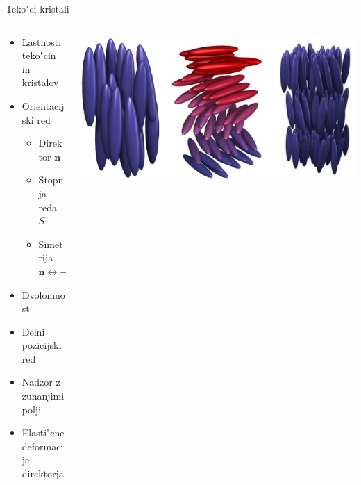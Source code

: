 \documentclass{beamer}
\renewcommand{\vec}{\mathbf}
\begin{document}
\begin{frame}{Teko"ci kristali}
 \begin{columns}[c]
  \begin{column}{.5\textwidth}
  
   \begin{itemize}
    \item Lastnosti teko"cin in kristalov
    \item Orientacijski red
      \begin{itemize}
	\item Direktor $\vec n$
	\item Stopnja reda $S$
	\item Simetrija $\vec n \leftrightarrow -\vec n$
      \end{itemize}
    \item Dvolomnost
    \item Delni pozicijski red
    \item Nadzor z zunanjimi polji
    \item Elasti"cne deformacije direktorja
   \end{itemize}
  \end{column}

  \begin{column}{.5\textwidth}
    \includegraphics[width=\textwidth]{./Slike/faze_brez_crk} \\


\end{column}
\end{columns}
\end{frame}
\end{document}
